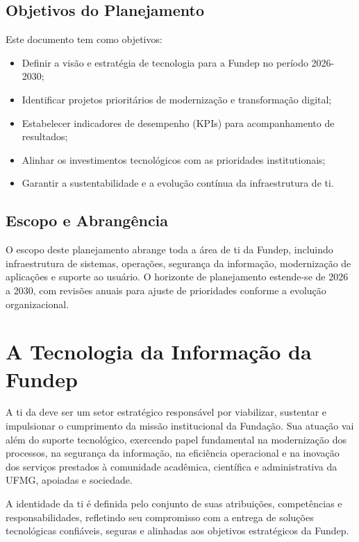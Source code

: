 \documentclass[12pt,a4paper]{article}
\begin{document}
\subsection{Objetivos do Planejamento}

Este documento tem como objetivos:

\begin{itemize}
  \item Definir a visão e estratégia de tecnologia para a Fundep no período 2026-2030;
  \item Identificar projetos prioritários de modernização e transformação digital;
  \item Estabelecer indicadores de desempenho (KPIs) para acompanhamento de resultados;
  \item Alinhar os investimentos tecnológicos com as prioridades institutionais;
  \item Garantir a sustentabilidade e a evolução contínua da infraestrutura de \gls{ti}.
\end{itemize}

\subsection{Escopo e Abrangência}

O escopo deste planejamento abrange toda a área de \gls{ti} da Fundep, incluindo infraestrutura de sistemas, operações, segurança da informação, modernização de aplicações e suporte ao usuário. O horizonte de planejamento estende-se de 2026 a 2030, com revisões anuais para ajuste de prioridades conforme a evolução organizacional.


\section{A Tecnologia da Informação da Fundep}

A \gls{ti} da  deve ser um setor estratégico responsável por viabilizar, sustentar e impulsionar o cumprimento da missão institucional da Fundação. Sua atuação vai além do suporte tecnológico, exercendo papel fundamental na modernização dos processos, na segurança da informação, na eficiência operacional e na inovação dos serviços prestados à comunidade acadêmica, científica e administrativa da UFMG, apoiadas e sociedade.

A identidade da \gls{ti} é definida pelo conjunto de suas atribuições, competências e responsabilidades, refletindo seu compromisso com a entrega de soluções tecnológicas confiáveis, seguras e alinhadas aos objetivos estratégicos da Fundep.
\end{document}

